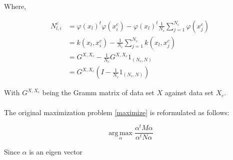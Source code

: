 Where,

\begin{align*}
  N^c_{l, i} &= \varphi(x_l)^t\varphi(x_i^c) - \varphi(x_l)^t \frac{1}{N_c}\sum_{j=1}^{N_c}\varphi(x_j^c) \\
             &= k(x_l, x_i^c) - \frac{1}{N_c}\sum_{j=1}^{N_c}k(x_l, x_j^c) \\
             &= G^{X, X_c} - \frac{1}{N_c} G^{X, X_c} 1_{(N_c, N)} \\
             &= G^{X, X_c} (I - \frac{1}{N_c}1_{(N_c, N)})
\end{align*}

With $G^{X, X_c}$ being the Gramm matrix of data set $X$ against data set $X_c$.

\paragraph{}
The original maximization problem \ref{maximize} is reformulated as follows:

\begin{equation*}
\label{maximize2}
\boxed{\operatorname*{arg\,max}_\alpha \frac{\alpha^t M \alpha}{\alpha^t N \alpha}}
\end{equation*}

Since $\alpha$ is an eigen vector 





